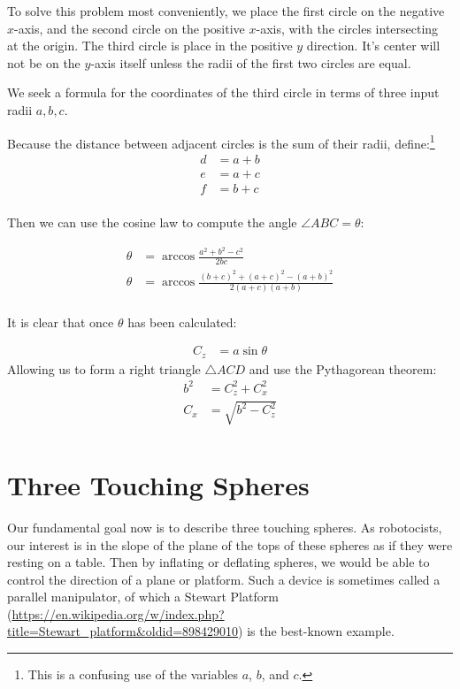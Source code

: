 \documentclass{article}
\begin{document}
To solve this problem most conveniently, we place the first circle on the negative $x$-axis, and the second circle
on the positive $x$-axis, with the circles intersecting at the origin.
The third circle is place in the positive $y$ direction. It's center will not be on the $y$-axis itself unless the
radii of the first two circles are equal.

We seek a formula for the coordinates of the third circle in terms of three input radii $a,b,c$.

Because the distance between adjacent circles is the sum of their radii, define:\footnote{This is a confusing use of the variables $a$, $b$, and $c$.}
\begin{align}
  d  &= a + b \\
  e  &= a + c \\
  f  &= b + c \\
\end{align}

Then we can use the cosine law to compute the angle $\angle ABC = \theta$:

\begin{align}
  \theta  &= \arccos{\frac{a^2 + b^2 - c^2}{2bc}} \\
  \theta  &= \arccos{\frac{(b+c)^2 + (a+c)^2 - (a+b)^2}{2(a+c)(a+b)}} \\
\end{align}

It is clear that once $\theta$ has been calculated:

\begin{align}
 C_z  &= a\sin{\theta}
\end{align}
Allowing us to form a right triangle $\triangle ACD$ and use the Pythagorean theorem:
\begin{align}
  b^2  &= C_z^2 + C_x^2 \\
  C_x   &= \sqrt{b^2 - C_z^2}  \\
\end{align}




\section{Three Touching Spheres}


Our fundamental goal now is to describe three touching spheres. As robotocists,
our interest is in the slope of the plane of the tops of these spheres
as if they were resting on a table. Then by inflating or deflating spheres,
we would be able to control the direction of a plane or platform.
Such a device is sometimes called a parallel manipulator, of which a
Stewart Platform\cite{wiki:stewart} (\url{https://en.wikipedia.org/w/index.php?title=Stewart_platform&oldid=898429010})
is the best-known example.
\end{document}
